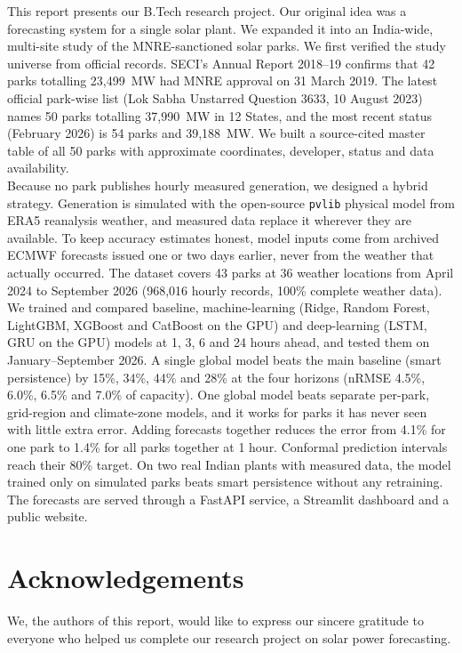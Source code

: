 \documentclass[12pt]{report}
\begin{document}
This report presents our B.Tech research project. Our original idea was a forecasting system for a single solar plant. We expanded it into an India-wide, multi-site study of the MNRE-sanctioned solar parks. We first verified the study universe from official records. SECI's Annual Report 2018--19 confirms that 42 parks totalling 23,499~MW had MNRE approval on 31 March 2019. The latest official park-wise list (Lok Sabha Unstarred Question 3633, 10 August 2023) names 50 parks totalling 37,990~MW in 12 States, and the most recent status (February 2026) is 54 parks and 39,188~MW. We built a source-cited master table of all 50 parks with approximate coordinates, developer, status and data availability.\\

Because no park publishes hourly measured generation, we designed a hybrid strategy. Generation is simulated with the open-source \texttt{pvlib} physical model from ERA5 reanalysis weather, and measured data replace it wherever they are available. To keep accuracy estimates honest, model inputs come from archived ECMWF forecasts issued one or two days earlier, never from the weather that actually occurred. The dataset covers 43 parks at 36 weather locations from April 2024 to September 2026 (968,016 hourly records, 100\% complete weather data).\\

We trained and compared baseline, machine-learning (Ridge, Random Forest, LightGBM, XGBoost and CatBoost on the GPU) and deep-learning (LSTM, GRU on the GPU) models at 1, 3, 6 and 24 hours ahead, and tested them on January--September 2026. A single global model beats the main baseline (smart persistence) by 15\%, 34\%, 44\% and 28\% at the four horizons (nRMSE 4.5\%, 6.0\%, 6.5\% and 7.0\% of capacity). One global model beats separate per-park, grid-region and climate-zone models, and it works for parks it has never seen with little extra error. Adding forecasts together reduces the error from 4.1\% for one park to 1.4\% for all parks together at 1 hour. Conformal prediction intervals reach their 80\% target. On two real Indian plants with measured data, the model trained only on simulated parks beats smart persistence without any retraining. The forecasts are served through a FastAPI service, a Streamlit dashboard and a public website.\\
\clearpage

\chapter*{Acknowledgements}
We, the authors of this report, would like to express our sincere gratitude to everyone who helped us complete our research project on solar power forecasting.\\
\end{document}
